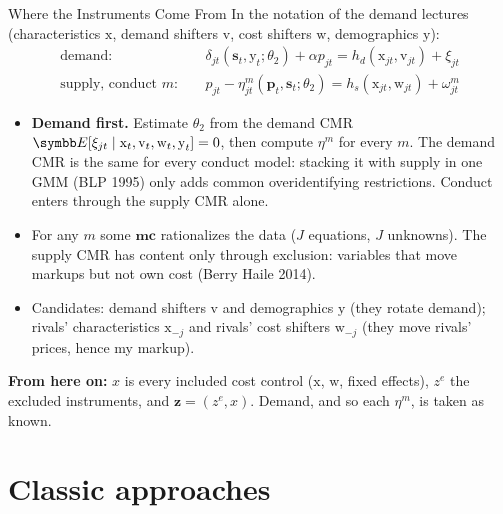 \documentclass[aspectratio=169,10pt]{beamer}
\begin{document}
\begin{frame}{Where the Instruments Come From}
\small
In the notation of the demand lectures (characteristics $\textrm{x}$, demand shifters $\textrm{v}$, cost shifters $\textrm{w}$, demographics $\textrm{y}$):
\begin{align*}
\text{demand:}&\quad \delta_{jt}(\symbf{s}_t, \textrm{y}_t; \theta_2) + \alpha p_{jt} = h_d(\textrm{x}_{jt}, \textrm{v}_{jt}) + \xi_{jt}\\
\text{supply, conduct } m:&\quad p_{jt} - \eta^m_{jt}(\symbf{p}_t, \symbf{s}_t; \theta_2) = h_s(\textrm{x}_{jt}, \textrm{w}_{jt}) + \omega^m_{jt}
\end{align*}
\vspace{-0.3cm}
\begin{itemize}
\item \textbf{Demand first.} Estimate $\theta_2$ from the demand CMR $\E[\xi_{jt} \mid \textrm{x}_t, \textrm{v}_t, \textrm{w}_t, \textrm{y}_t] = 0$, then compute $\eta^m$ for \alert{every} $m$. The demand CMR is the same for every conduct model: stacking it with supply in one GMM (BLP 1995) only adds common overidentifying restrictions. Conduct enters through the \alert{supply CMR} alone.
\item For any $m$ some $\symbf{mc}$ rationalizes the data ($J$ equations, $J$ unknowns). The supply CMR has content only through \alert{exclusion}: variables that move markups but not own cost (Berry Haile 2014).
\item Candidates: demand shifters $\textrm{v}$ and demographics $\textrm{y}$ (they rotate demand); rivals' characteristics $\textrm{x}_{-j}$ and rivals' cost shifters $\textrm{w}_{-j}$ (they move rivals' prices, hence my markup).
\end{itemize}
\textbf{From here on:} $x$ is every included cost control ($\textrm{x}$, $\textrm{w}$, fixed effects), $z^e$ the excluded instruments, and $\symbf{z} = (z^e, x)$. Demand, and so each $\eta^m$, is taken as known.
\end{frame}


\section{Classic approaches}
\end{document}
